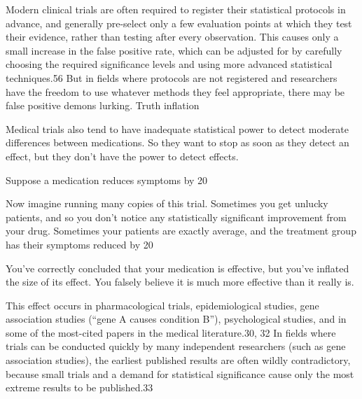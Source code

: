 Modern clinical trials are often required to register their statistical protocols in advance, and generally pre-select only a few evaluation points at which they test their evidence, rather than testing after every observation. This causes only a small increase in the false positive rate, which can be adjusted for by carefully choosing the required significance levels and using more advanced statistical techniques.56 But in fields where protocols are not registered and researchers have the freedom to use whatever methods they feel appropriate, there may be false positive demons lurking.
Truth inflation

Medical trials also tend to have inadequate statistical power to detect moderate differences between medications. So they want to stop as soon as they detect an effect, but they don’t have the power to detect effects.

Suppose a medication reduces symptoms by 20%

Now imagine running many copies of this trial. Sometimes you get unlucky patients, and so you don’t notice any statistically significant improvement from your drug. Sometimes your patients are exactly average, and the treatment group has their symptoms reduced by 20%

You’ve correctly concluded that your medication is effective, but you’ve inflated the size of its effect. You falsely believe it is much more effective than it really is.

This effect occurs in pharmacological trials, epidemiological studies, gene association studies (“gene A causes condition B”), psychological studies, and in some of the most-cited papers in the medical literature.30, 32 In fields where trials can be conducted quickly by many independent researchers (such as gene association studies), the earliest published results are often wildly contradictory, because small trials and a demand for statistical significance cause only the most extreme results to be published.33

